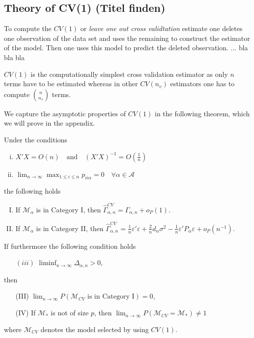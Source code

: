 \documentclass[Research_Module_ES.tex]{subfiles}
\begin{document}
\subsection{Theory of CV(1) (Titel finden)}
To compute the $CV(1)$ or \textit{leave one out cross validtation} estimate one deletes one observation of the data set and uses the remaining to construct the estimator of the model. Then one uses this model to predict the deleted observation. ... bla bla bla\

$CV(1)$ is the computationally simplest cross validation estimator as only $n$ terms have to be estimated whereas in other $CV(n_v)$ estimators one has to compute $\binom{n}{n_v}$ terms.\

We capture the asymptotic properties of $CV(1)$ in the following theorem, which we will prove in the appendix.

\begin{satz}[Consistency of $CV(1)$]
Under the conditions 
\begin{enumerate}[(i)]
\item $X'X = O(n) \quad \textrm{and} \quad (X'X)^{-1}=O(\frac{1}{n})$
\item $ \lim_{n \to \infty} \max_{1\le i\le n} p_{ii\alpha} =0 \quad \forall \alpha \in \mathcal{A} $ 
\end{enumerate}
the following holds
\begin{enumerate}[(I)]
\item If $\mathcal{M}_\alpha$ is in Category I, then $\hat{\Gamma}_{\alpha,n}^{CV} = \Gamma_{\alpha,n} + o_P(1)$.
\item If $\mathcal{M}_\alpha$ is in Category II, then $\hat{\Gamma}_{\alpha,n}^{CV} = \frac{1}{n}\varepsilon'\varepsilon + \frac{2}{n}d_\alpha\sigma^2 - \frac{1}{n}\varepsilon'P_\alpha\varepsilon + o_P(n^{-1})$.
\end{enumerate}
If furthermore the following condition holds
\begin{itemize}
\item[$(iii)$] $\liminf_{n\to \infty} \Delta_{\alpha,n} > 0,$
\end{itemize}
then 
\begin{enumerate}
\item[(III)] $\lim_{n\to\infty} P(\mathcal{M}_{CV}\textrm{ is in Category I})=0$,
\item[(IV)]If $\mathcal{M}_\ast$ is not of size $p$, then $\lim_{n\to\infty}P(\mathcal{M}_{CV}=\mathcal{M}_\ast) \neq 1$
\end{enumerate}
where $\mathcal{M}_{CV}$ denotes the model selected by using $CV(1)$.
\end{satz}
\end{document}
